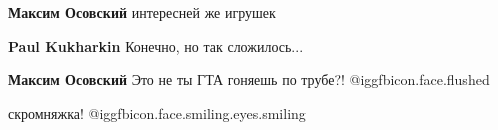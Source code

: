 \begin{multicols}{2}
\begin{itemize} %
\textbf{Максим Осовский} интересней же игрушек

\textbf{Paul Kukharkin} Конечно, но так сложилось...

\textbf{Максим Осовский} Это не ты ГТА гоняешь по трубе?!  @igg{fbicon.face.flushed} 
\end{itemize} %

скромняжка!  @igg{fbicon.face.smiling.eyes.smiling} 




\end{multicols}
